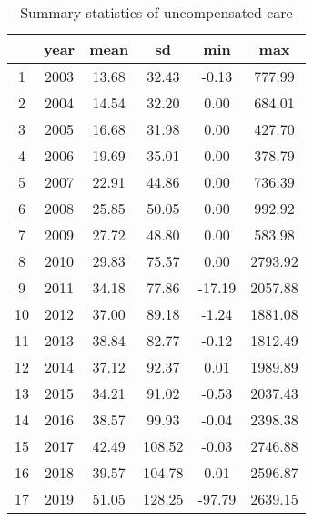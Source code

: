 \begin{table}[ht]
\centering
\begin{tabular}{cccccc}
  \hline
 & year & mean & sd & min & max \\ 
  \hline
1 & 2003 & 13.68 & 32.43 & -0.13 & 777.99 \\ 
  2 & 2004 & 14.54 & 32.20 & 0.00 & 684.01 \\ 
  3 & 2005 & 16.68 & 31.98 & 0.00 & 427.70 \\ 
  4 & 2006 & 19.69 & 35.01 & 0.00 & 378.79 \\ 
  5 & 2007 & 22.91 & 44.86 & 0.00 & 736.39 \\ 
  6 & 2008 & 25.85 & 50.05 & 0.00 & 992.92 \\ 
  7 & 2009 & 27.72 & 48.80 & 0.00 & 583.98 \\ 
  8 & 2010 & 29.83 & 75.57 & 0.00 & 2793.92 \\ 
  9 & 2011 & 34.18 & 77.86 & -17.19 & 2057.88 \\ 
  10 & 2012 & 37.00 & 89.18 & -1.24 & 1881.08 \\ 
  11 & 2013 & 38.84 & 82.77 & -0.12 & 1812.49 \\ 
  12 & 2014 & 37.12 & 92.37 & 0.01 & 1989.89 \\ 
  13 & 2015 & 34.21 & 91.02 & -0.53 & 2037.43 \\ 
  14 & 2016 & 38.57 & 99.93 & -0.04 & 2398.38 \\ 
  15 & 2017 & 42.49 & 108.52 & -0.03 & 2746.88 \\ 
  16 & 2018 & 39.57 & 104.78 & 0.01 & 2596.87 \\ 
  17 & 2019 & 51.05 & 128.25 & -97.79 & 2639.15 \\ 
   \hline
\end{tabular}
\caption{Summary statistics of uncompensated care} 
\end{table}
